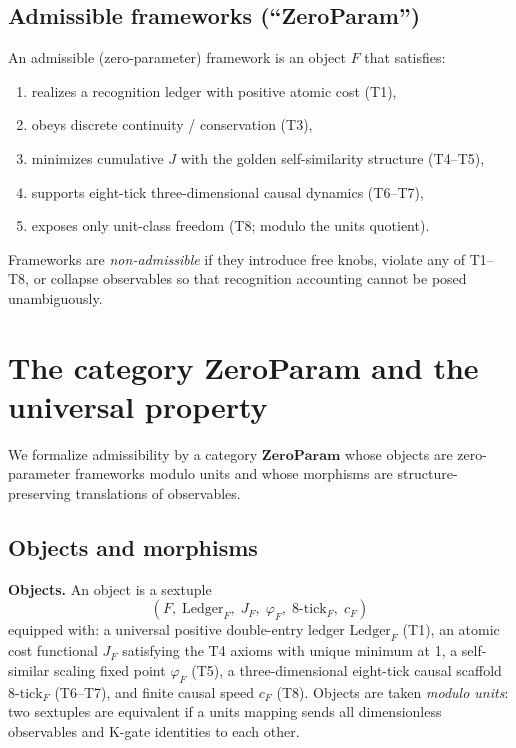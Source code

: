 \documentclass[11pt]{article}
\begin{document}
\subsection{Admissible frameworks (``ZeroParam'')}
An admissible (zero\mbox{-}parameter) framework is an object \(F\) that satisfies:
\begin{enumerate}
  \item realizes a recognition ledger with positive atomic cost (T1),
  \item obeys discrete continuity / conservation (T3),
  \item minimizes cumulative \(J\) with the golden self\mbox{-}similarity structure (T4--T5),
  \item supports eight\mbox{-}tick three\mbox{-}dimensional causal dynamics (T6--T7),
  \item exposes only unit\mbox{-}class freedom (T8; modulo the units quotient).
\end{enumerate}
Frameworks are \emph{non\mbox{-}admissible} if they introduce free knobs, violate any of T1--T8, or collapse observables so that recognition accounting cannot be posed unambiguously.

\section{The category ZeroParam and the universal property}
We formalize admissibility by a category \(\mathbf{ZeroParam}\) whose objects are zero\mbox{-}parameter frameworks modulo units and whose morphisms are structure\mbox{-}preserving translations of observables.

\subsection{Objects and morphisms}
\textbf{Objects.} An object is a sextuple
\[
  (F,\; \mathrm{Ledger}_F,\; J_F,\; \varphi_F,\; 8\mbox{-}\mathrm{tick}_F,\; c_F)
\]
equipped with: a universal positive double\mbox{-}entry ledger \(\mathrm{Ledger}_F\) (T1), an atomic cost functional \(J_F\) satisfying the T4 axioms with unique minimum at 1, a self\mbox{-}similar scaling fixed point \(\varphi_F\) (T5), a three\mbox{-}dimensional eight\mbox{-}tick causal scaffold \(8\mbox{-}\mathrm{tick}_F\) (T6--T7), and finite causal speed \(c_F\) (T8). Objects are taken \emph{modulo units}: two sextuples are equivalent if a units mapping sends all dimensionless observables and K\mbox{-}gate identities to each other.
\end{document}
